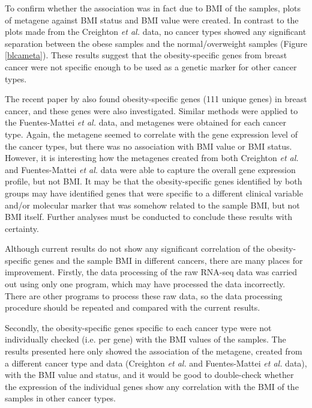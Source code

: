 \documentclass[12pt, a4paper]{article}
\begin{document}
To confirm whether the association was in fact due to BMI of the samples, plots of metagene against BMI status and BMI value were created.
In contrast to the  plots made from the Creighton \textit{et al.} data, no cancer types showed any significant separation between the obese samples and the normal/overweight samples (Figure \ref{blcameta}).
These results suggest that the obesity-specific genes from breast cancer were not specific enough to be used as a genetic marker for other cancer types.

The recent paper by \citet{Fuentes-Mattei2014} also found  obesity-specific genes (111 unique genes) in breast cancer, and these genes were also investigated.
Similar methods were applied to the Fuentes-Mattei \textit{et al.} data, and metagenes were obtained for each cancer type.
Again, the metagene seemed to correlate with the gene expression level of the cancer types, but there was no association with BMI value or BMI status.
However, it is interesting how the metagenes created from both Creighton \textit{et al.} and Fuentes-Mattei \textit{et al.} data were able to capture the overall gene expression profile, but not BMI.
It may be that the obesity-specific genes identified by both groups may have identified genes that were specific to a different clinical variable and/or molecular marker that was somehow related to the sample BMI, but not BMI itself.
Further analyses must be conducted to conclude these results with certainty.

Although current results do not show any significant correlation of the obesity-specific genes and the sample BMI in different cancers, there are many places for improvement.
Firstly, the data processing of the raw RNA-seq data was carried out using only one program, which may have processed the data incorrectly.
There are other programs to process these raw data, so the data processing procedure should be repeated and compared with the current results.

Secondly, the obesity-specific genes specific to each cancer type were not individually checked (i.e. per gene) with the BMI values of the samples.
The results presented here only showed the association of the metagene, created from a different cancer type and data (Creighton \textit{et al.} and Fuentes-Mattei \textit{et al.} data), with the BMI value and status, and it would be good to double-check whether the expression of the individual genes show any correlation with the BMI of the samples in other cancer types.
\end{document}
